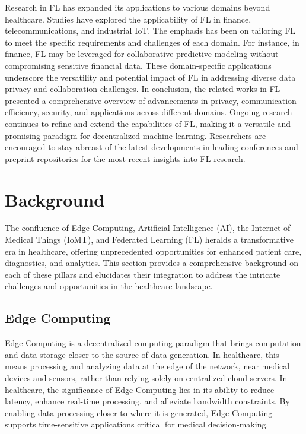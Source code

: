 \documentclass[conference]{IEEEtran}
\begin{document}

Research in FL has expanded its applications to various domains beyond healthcare. Studies have explored the applicability of FL in finance, telecommunications, and industrial IoT. The emphasis has been on tailoring FL to meet the specific requirements and challenges of each domain. For instance, in finance, FL may be leveraged for collaborative predictive modeling without compromising sensitive financial data. These domain-specific applications underscore the versatility and potential impact of FL in addressing diverse data privacy\cite{8} and collaboration challenges. In conclusion, the related works in FL presented a comprehensive overview of advancements in privacy, communication efficiency, security, and applications across different domains. Ongoing research continues to refine and extend the capabilities of FL, making it a versatile and promising paradigm for decentralized machine learning. Researchers are encouraged to stay abreast of the latest developments in leading conferences and preprint repositories for the most recent insights into FL research.

\section{Background}

The confluence of Edge Computing, Artificial Intelligence (AI), the Internet of Medical Things (IoMT), and Federated Learning (FL) heralds a transformative era in healthcare, offering unprecedented opportunities for enhanced patient care, diagnostics, and analytics. This section provides a comprehensive background on each of these pillars and elucidates their integration to address the intricate challenges and opportunities in the healthcare landscape.

\subsection{Edge Computing}

Edge Computing is a decentralized computing paradigm that brings computation and data storage closer to the source of data generation. In healthcare, this means processing and analyzing data at the edge of the network\cite{2, 10}, near medical devices and sensors, rather than relying solely on centralized cloud servers. In healthcare, the significance of Edge Computing lies in its ability to reduce latency, enhance real-time processing, and alleviate bandwidth constraints. By enabling data processing closer to where it is generated, Edge Computing supports time-sensitive applications critical for medical decision-making.
\end{document}
